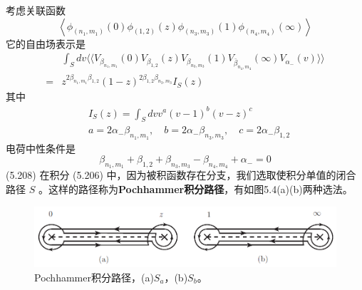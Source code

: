 考虑关联函数
\begin{equation}
	\left\langle\phi_{\left(n_{1}, m_{1}\right)}(0) \phi_{(1,2)}(z) \phi_{\left(n_{3}, m_{3}\right)}(1) \phi_{\left(n_{4}, m_{4}\right)}(\infty)\right\rangle 
\end{equation}
它的自由场表示是
\begin{equation}
	\begin{aligned} & \int_{S} d v \langle \langle V_{\beta_{n_{1}, m_{1}}}(0) V_{\beta_{1,2}}(z) V_{\beta_{n_{3}, m_{3}}}(1) V_{\bar{\beta}_{n_{4}, m_{4}}}(\infty) V_{\alpha_{-}}(v) \rangle \rangle \\ =& z^{2 \beta_{n_{1}, m_{1}} \beta_{1,2}}(1-z)^{2 \beta_{1,2} \beta_{n_{3}, m_{3}}} I_{S}(z) \end{aligned}
\end{equation} 
其中
\begin{align} &I_{S}(z)=\int_{S} d v v^{a}(v-1)^{b}(v-z)^{c}\\ &a=2 \alpha_{-} \beta_{n_{1}, m_{1}}, \quad b=2 \alpha_{-} \beta_{n_{3}, m_{3}}, \quad c=2 \alpha_{-} \beta_{1,2} \end{align}
电荷中性条件是
\begin{equation}
	\beta_{n_{1}, m_{1}}+\beta_{1,2}+\beta_{n_{3}, m_{3}}-\beta_{n_{4}, m_{4}}+\alpha_{-}=0
\end{equation} \quad \quad (5.208)
在积分 (5.206) 中，因为被积函数存在分支，我们选取使积分单值的闭合路径 $S$ 。这样的路径称为\textbf{Pochhammer积分路径}，有如图5.4(a)(b)两种选法。

\begin{figure}[h]
	\centering
	\includegraphics[width=0.6\linewidth]{fig/5.4.png}
	\caption{Pochhammer积分路径，(a)$S_a$，(b)$S_b$。}
\end{figure}

